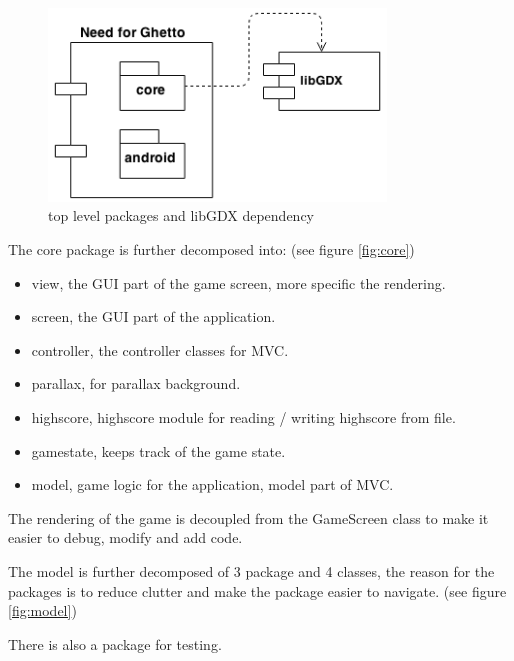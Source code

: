 \documentclass{article}
\begin{document}
\begin{figure}[h]
  \centering
  \includegraphics[width=0.8\textwidth]{nfg.png}
  \caption{top level packages and libGDX dependency}
  \label{fig:nfg}
\end{figure}

The core package is further decomposed into: (see figure \ref{fig:core})
\begin{itemize}
  \item view, the GUI part of the game screen, more specific the rendering.
  \item screen, the GUI part of the application.
  \item controller, the controller classes for MVC.
  \item parallax, for parallax background.
  \item highscore, highscore module for reading / writing highscore from file.
  \item gamestate, keeps track of the game state.
  \item model, game logic for the application, model part of MVC.
\end{itemize}

The rendering of the game is decoupled from the GameScreen class to make it easier to debug, modify and add code.

The model is further decomposed of 3 package and 4 classes, the reason for the packages is to reduce clutter and make the package easier to navigate. (see figure \ref{fig:model})

There is also a package for testing.
\end{document}
